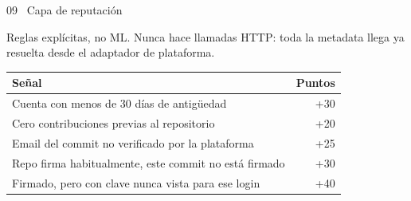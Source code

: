 \documentclass[9pt,aspectratio=169]{beamer}
\newcommand{\lbl}{\OptimaFontBold\bfseries\fontsize{8.6}{9.5}\selectfont\color{brandnavy2}}
\newcommand{\sub}{\fontsize{7.6}{9}\selectfont\color{inksoft}}
\begin{document}
\begin{frame}{09 \textperiodcentered\ Capa de reputación}
\par\vspace{4pt}
{\color{inksoft}\footnotesize Reglas explícitas, no ML. Nunca hace llamadas HTTP: toda la metadata llega ya resuelta desde el adaptador de plataforma.}

\vspace{8pt}
\centering
{\small
\renewcommand{\arraystretch}{1.4}
\begin{tabular}{@{}l r@{}}
\toprule
\textbf{\footnotesize Señal} & \textbf{\footnotesize Puntos} \\
\midrule
Cuenta con menos de 30 días de antigüedad & +30 \\
Cero contribuciones previas al repositorio & +20 \\
Email del commit no verificado por la plataforma & +25 \\
Repo firma habitualmente, este commit no está firmado & +30 \\
Firmado, pero con clave nunca vista para ese login & +40 \\
\bottomrule
\end{tabular}
}

\vspace{10pt}
\end{frame}
\end{document}

